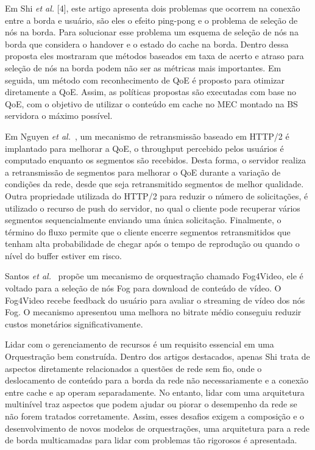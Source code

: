 Em Shi \textit{et al.} [4], 
este artigo apresenta dois problemas que ocorrem na conexão entre a borda e usuário, são eles o efeito ping-pong e o problema de seleção de nós na borda. Para solucionar esse problema 
um esquema de seleção de nós na borda que considera o handover e o estado do cache na borda. 
Dentro dessa proposta eles mostraram que métodos baseados em taxa de acerto e atraso para seleção de nós na borda podem não ser as métricas mais importantes.
Em seguida, um método com reconhecimento de QoE é proposto para otimizar diretamente a QoE. Assim, as políticas propostas são executadas com base no QoE, com o objetivo de utilizar o conteúdo em cache no MEC montado na BS servidora o máximo possível.

Em Nguyen \textit{et al.}~\cite{Nguyen2020}, um mecanismo de retransmissão baseado em HTTP/2 é implantado para melhorar a QoE, o throughput percebido pelos usuários é computado enquanto os segmentos são recebidos. Desta forma, o servidor realiza a retransmissão de segmentos para melhorar o QoE durante a variação de condições da rede, desde que seja retransmitido segmentos de melhor qualidade.
Outra propriedade utilizada do HTTP/2 para reduzir o número de solicitações, é utilizado o recurso de push do servidor, no qual o cliente pode recuperar vários segmentos sequencialmente enviando uma única solicitação. Finalmente, o término do fluxo permite que o cliente encerre segmentos retransmitidos que tenham alta probabilidade de chegar após o tempo de reprodução ou quando o nível do buffer estiver em risco.

Santos \textit{et al.}~\cite{SANTOS2020} propõe um mecanismo de orquestração chamado Fog4Video, ele é voltado para a seleção de nós Fog para download de conteúdo de vídeo. 
O Fog4Video recebe feedback do usuário para avaliar o streaming de vídeo dos nós Fog. 
O mecanismo apresentou uma melhora no bitrate médio conseguiu reduzir custos monetários significativamente.

Lidar com o gerenciamento de recursos é um requisito essencial em uma Orquestração bem construída. Dentro dos artigos destacados, apenas Shi trata de aspectos diretamente relacionados a questões de rede sem fio, onde o deslocamento de conteúdo para a borda da rede não necessariamente e a conexão entre cache e ap operam separadamente. No entanto, lidar com uma arquitetura multinível traz aspectos que podem ajudar ou piorar o desempenho da rede se não forem tratados corretamente. Assim, esses desafios exigem a composição e o desenvolvimento de novos modelos de orquestrações, uma arquitetura para a rede de borda multicamadas para lidar com problemas tão rigorosos é apresentada.